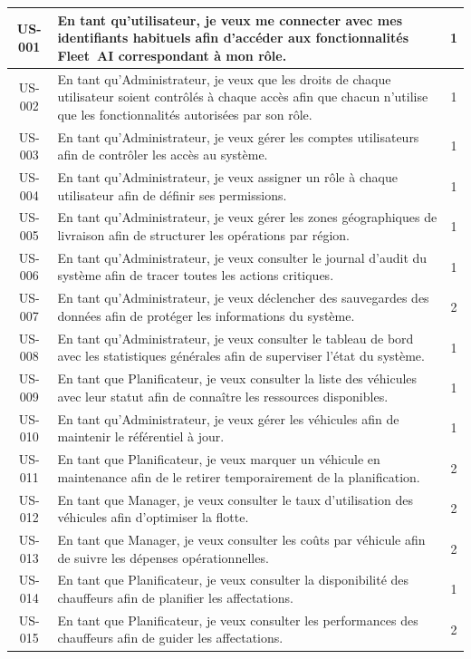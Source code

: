 \begin{longtable}{|c|>{\raggedright\arraybackslash}p{13cm}|c|}
US-001 & En tant qu'utilisateur, je veux me connecter avec mes identifiants habituels afin d'accéder aux fonctionnalités Fleet~AI correspondant à mon rôle. & 1 \\\hline
US-002 & En tant qu'Administrateur, je veux que les droits de chaque utilisateur soient contrôlés à chaque accès afin que chacun n'utilise que les fonctionnalités autorisées par son rôle. & 1 \\\hline
US-003 & En tant qu'Administrateur, je veux gérer les comptes utilisateurs afin de contrôler les accès au système. & 1 \\\hline
US-004 & En tant qu'Administrateur, je veux assigner un rôle à chaque utilisateur afin de définir ses permissions. & 1 \\\hline
US-005 & En tant qu'Administrateur, je veux gérer les zones géographiques de livraison afin de structurer les opérations par région. & 1 \\\hline
US-006 & En tant qu'Administrateur, je veux consulter le journal d'audit du système afin de tracer toutes les actions critiques. & 1 \\\hline
US-007 & En tant qu'Administrateur, je veux déclencher des sauvegardes des données afin de protéger les informations du système. & 2 \\\hline
US-008 & En tant qu'Administrateur, je veux consulter le tableau de bord avec les statistiques générales afin de superviser l'état du système. & 1 \\\hline
US-009 & En tant que Planificateur, je veux consulter la liste des véhicules avec leur statut afin de connaître les ressources disponibles. & 1 \\\hline
US-010 & En tant qu'Administrateur, je veux gérer les véhicules afin de maintenir le référentiel à jour. & 1 \\\hline
US-011 & En tant que Planificateur, je veux marquer un véhicule en maintenance afin de le retirer temporairement de la planification. & 2 \\\hline
US-012 & En tant que Manager, je veux consulter le taux d'utilisation des véhicules afin d'optimiser la flotte. & 2 \\\hline
US-013 & En tant que Manager, je veux consulter les coûts par véhicule afin de suivre les dépenses opérationnelles. & 2 \\\hline
US-014 & En tant que Planificateur, je veux consulter la disponibilité des chauffeurs afin de planifier les affectations. & 1 \\\hline
US-015 & En tant que Planificateur, je veux consulter les performances des chauffeurs afin de guider les affectations. & 2 \\\hline

\end{longtable}
